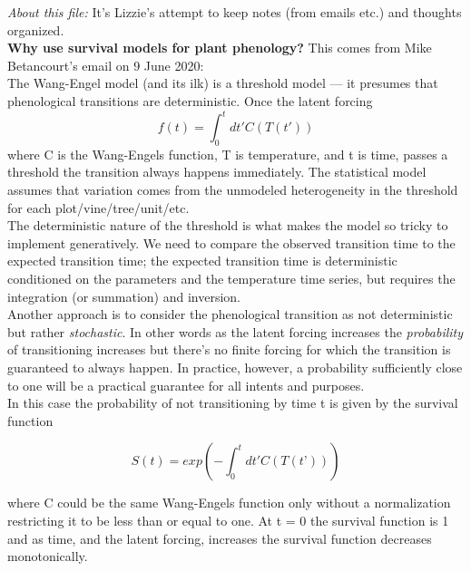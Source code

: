 \documentclass[11pt,letter]{article}
\begin{document}

\renewcommand{\refname}{\CHead{}}

\emph{About this file:} It's Lizzie's attempt to keep notes (from emails etc.) and thoughts organized.\\

{\bf Why use survival models for plant phenology?} This comes from Mike Betancourt's email on 9 June 2020:\\

The Wang-Engel model (and its ilk) is a threshold model — it presumes 
that phenological transitions are deterministic.  Once the latent forcing 
\begin{equation*}
f(t) = \int_{0}^{t} dt' C(T(t'))
\end{equation*}
where C is the Wang-Engels function, T is temperature, and t is time,
passes a threshold the transition always happens immediately.  The 
statistical model assumes that variation comes from the unmodeled 
heterogeneity in the threshold for each plot/vine/tree/unit/etc.\\

The deterministic nature of the threshold is what makes the model so
tricky to implement generatively.  We need to compare the observed 
transition time to the expected transition time; the expected transition 
time is deterministic conditioned on the parameters and the temperature 
time series, but requires the integration (or summation) and inversion.\\

Another approach is to consider the phenological transition as not 
deterministic but rather \emph{stochastic}.  In other words as the latent 
forcing increases the \emph{probability} of transitioning increases but there’s 
no finite forcing for which the transition is guaranteed to always happen.
In practice, however, a probability sufficiently close to one will be a 
practical guarantee for all intents and purposes.\\

In this case the probability of not transitioning by time t is given by the 
survival function

\begin{equation*}
S(t) = exp( - \int_{0}^{t} dt' C(T(t’)) )
\end{equation*}

where C could be the same Wang-Engels function only without a 
normalization restricting it to be less than or equal to one.  At t = 0
the survival function is 1 and as time, and the latent forcing, increases
the survival function decreases monotonically.
\end{document}
